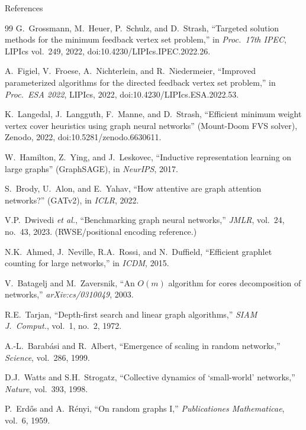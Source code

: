 \documentclass[aspectratio=169,10pt]{beamer}
\renewcommand{\footnotesize}{\tiny}
\begin{document}
\begin{frame}[allowframebreaks]{References}
\begin{thebibliography}{99}
      G.~Grossmann, M.~Heuer, P.~Schulz, and D.~Strash,
      ``Targeted solution methods for the minimum feedback vertex set problem,''
      in \emph{Proc.\ 17th IPEC}, LIPIcs vol.~249, 2022,
      doi:10.4230/LIPIcs.IPEC.2022.26.

      A.~Figiel, V.~Froese, A.~Nichterlein, and R.~Niedermeier,
      ``Improved parameterized algorithms for the directed feedback vertex set problem,''
      in \emph{Proc.\ ESA 2022}, LIPIcs, 2022,
      doi:10.4230/LIPIcs.ESA.2022.53.

      K.~Langedal, J.~Langguth, F.~Manne, and D.~Strash,
      ``Efficient minimum weight vertex cover heuristics using graph neural networks'' (Mount-Doom FVS solver),
      Zenodo, 2022, doi:10.5281/zenodo.6630611.

      W.~Hamilton, Z.~Ying, and J.~Leskovec,
      ``Inductive representation learning on large graphs'' (GraphSAGE),
      in \emph{NeurIPS}, 2017.

      S.~Brody, U.~Alon, and E.~Yahav,
      ``How attentive are graph attention networks?'' (GATv2),
      in \emph{ICLR}, 2022.

      V.P.~Dwivedi \emph{et al.},
      ``Benchmarking graph neural networks,''
      \emph{JMLR}, vol.~24, no.~43, 2023.
      {\footnotesize(RWSE/positional encoding reference.)}

      N.K.~Ahmed, J.~Neville, R.A.~Rossi, and N.~Duffield,
      ``Efficient graphlet counting for large networks,''
      in \emph{ICDM}, 2015.

      V.~Batagelj and M.~Zaversnik,
      ``An $O(m)$ algorithm for cores decomposition of networks,''
      \emph{arXiv:cs/0310049}, 2003.

      R.E.~Tarjan,
      ``Depth-first search and linear graph algorithms,''
      \emph{SIAM J.~Comput.}, vol.~1, no.~2, 1972.

      A.-L.~Barabási and R.~Albert,
      ``Emergence of scaling in random networks,''
      \emph{Science}, vol.~286, 1999.

      D.J.~Watts and S.H.~Strogatz,
      ``Collective dynamics of `small-world' networks,''
      \emph{Nature}, vol.~393, 1998.

      P.~Erdős and A.~Rényi,
      ``On random graphs I,''
      \emph{Publicationes Mathematicae}, vol.~6, 1959.
  \end{thebibliography}
\end{frame}
\end{document}
